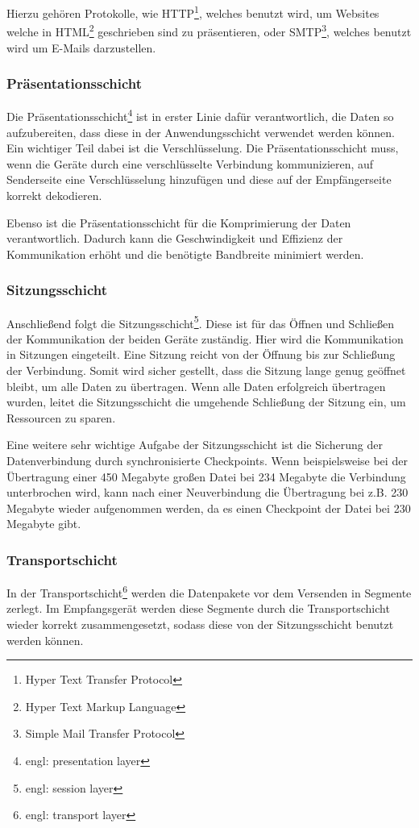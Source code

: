 \documentclass[12pt]{article}
\begin{document}
	Hierzu gehören Protokolle, wie HTTP\footnote{Hyper Text Transfer Protocol}, welches benutzt wird, um Websites welche in HTML\footnote{Hyper Text Markup Language} geschrieben sind zu präsentieren, oder SMTP\footnote{Simple Mail Transfer Protocol}, welches benutzt wird um E-Mails darzustellen.

\subsubsection{Präsentationsschicht}
	Die Präsentationsschicht\footnote{engl: presentation layer} ist in erster Linie dafür verantwortlich, die Daten so aufzubereiten, dass diese in der Anwendungsschicht verwendet werden können. Ein wichtiger Teil dabei ist die Verschlüsselung. Die Präsentationsschicht muss, wenn die Geräte durch eine verschlüsselte Verbindung kommunizieren, auf Senderseite eine Verschlüsselung hinzufügen und diese auf der Empfängerseite korrekt dekodieren. 
	
	Ebenso ist die Präsentationsschicht für die Komprimierung der Daten verantwortlich. Dadurch kann die Geschwindigkeit und Effizienz der Kommunikation erhöht und die benötigte Bandbreite minimiert werden.

\subsubsection{Sitzungsschicht}
	Anschließend folgt die Sitzungsschicht\footnote{engl: session layer}. Diese ist für das Öffnen und Schließen der Kommunikation der beiden Geräte zuständig. Hier wird die Kommunikation in Sitzungen eingeteilt. Eine Sitzung reicht von der Öffnung bis zur Schließung der Verbindung. Somit wird sicher gestellt, dass die Sitzung lange genug geöffnet bleibt, um alle Daten zu übertragen. Wenn alle Daten erfolgreich übertragen wurden, leitet die Sitzungsschicht die umgehende Schließung der Sitzung ein, um Ressourcen zu sparen. 
	
	Eine weitere sehr wichtige Aufgabe der Sitzungsschicht ist die Sicherung der Datenverbindung durch synchronisierte Checkpoints. Wenn beispielsweise bei der Übertragung einer 450 Megabyte großen Datei bei 234 Megabyte die Verbindung unterbrochen wird, kann nach einer Neuverbindung die Übertragung bei z.B. 230 Megabyte wieder aufgenommen werden, da es einen Checkpoint der Datei bei 230 Megabyte gibt.

\subsubsection{Transportschicht}
	In der Transportschicht\footnote{engl: transport layer} werden die Datenpakete vor dem Versenden in Segmente zerlegt. Im Empfangsgerät werden diese Segmente durch die Transportschicht wieder korrekt zusammengesetzt, sodass diese von der Sitzungsschicht benutzt werden können. 
	
\end{document}

